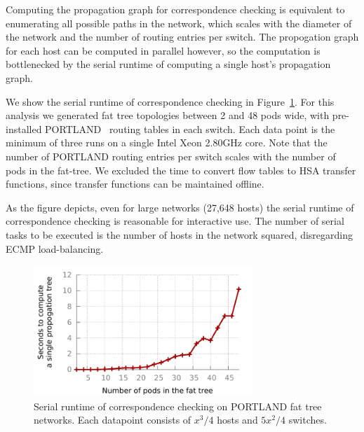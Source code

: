 
 Computing the propagation
graph for correspondence checking is equivalent to enumerating
all possible paths in the network, which scales with the diameter
of the network and the number of routing entries per switch.
The propogation graph for each host can be
computed in parallel however, so the computation is bottlenecked by the serial runtime
of computing a single host's propagation graph.

We show the serial runtime of correspondence checking in 
Figure~\ref{fig:hsa_runtime}. For this analysis we generated fat tree topologies
between 2 and 48 pods wide, with pre-installed PORTLAND~\cite{NiranjanMysore:2009:PSF:1592568.1592575}
routing tables in each switch. Each data point is the minimum of three
runs on a single Intel Xeon 2.80GHz core. Note that the number of PORTLAND routing entries per switch scales with the number
of pods in the fat-tree. We excluded the time to convert
flow tables to HSA transfer functions, since transfer functions can be maintained
offline.

As the figure depicts, even for large networks
(27,648 hosts) the serial runtime of correspondence checking is reasonable for
interactive use. The number of serial tasks to be executed
is the number of hosts in the network squared, disregarding ECMP load-balancing.

\begin{figure}[t]
    \includegraphics[width=3.25in]{../graphs/hsa_overhead_graph/graph.pdf}
    \caption[]{\label{fig:hsa_runtime} Serial runtime of correspondence
    checking on PORTLAND fat tree networks. Each datapoint consists of
    $x^3/4$ hosts and $5x^2/4$ switches.}
\end{figure}

 
